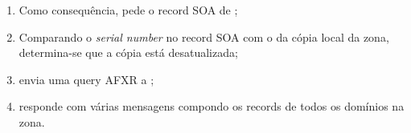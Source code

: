 \begin{enumerate}
    \item Como consequência,  pede o record SOA de ;
    \item Comparando o \emph{serial number} no record SOA com o da cópia local da zona, determina-se que a cópia está desatualizada;
    \item {} envia uma query AFXR a ;
    \item {} responde com várias mensagens compondo os records de todos os domínios na zona.
\end{enumerate}


